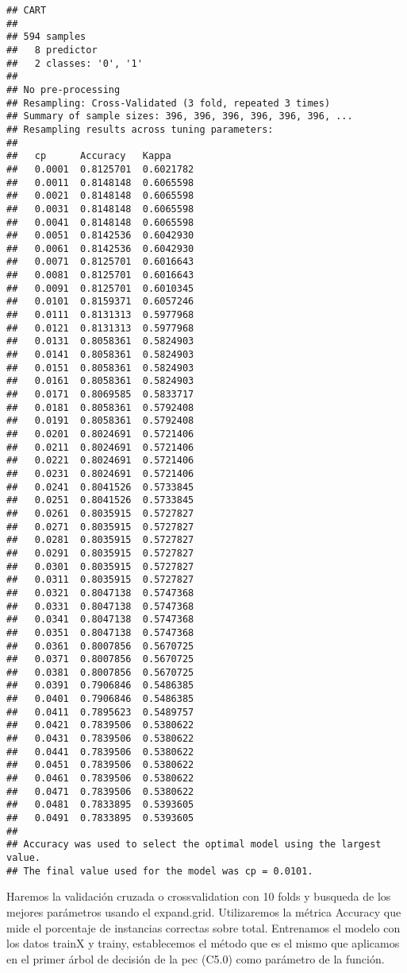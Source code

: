 \documentclass[
]{article}
\begin{document}
\begin{verbatim}
## CART 
## 
## 594 samples
##   8 predictor
##   2 classes: '0', '1' 
## 
## No pre-processing
## Resampling: Cross-Validated (3 fold, repeated 3 times) 
## Summary of sample sizes: 396, 396, 396, 396, 396, 396, ... 
## Resampling results across tuning parameters:
## 
##   cp      Accuracy   Kappa    
##   0.0001  0.8125701  0.6021782
##   0.0011  0.8148148  0.6065598
##   0.0021  0.8148148  0.6065598
##   0.0031  0.8148148  0.6065598
##   0.0041  0.8148148  0.6065598
##   0.0051  0.8142536  0.6042930
##   0.0061  0.8142536  0.6042930
##   0.0071  0.8125701  0.6016643
##   0.0081  0.8125701  0.6016643
##   0.0091  0.8125701  0.6010345
##   0.0101  0.8159371  0.6057246
##   0.0111  0.8131313  0.5977968
##   0.0121  0.8131313  0.5977968
##   0.0131  0.8058361  0.5824903
##   0.0141  0.8058361  0.5824903
##   0.0151  0.8058361  0.5824903
##   0.0161  0.8058361  0.5824903
##   0.0171  0.8069585  0.5833717
##   0.0181  0.8058361  0.5792408
##   0.0191  0.8058361  0.5792408
##   0.0201  0.8024691  0.5721406
##   0.0211  0.8024691  0.5721406
##   0.0221  0.8024691  0.5721406
##   0.0231  0.8024691  0.5721406
##   0.0241  0.8041526  0.5733845
##   0.0251  0.8041526  0.5733845
##   0.0261  0.8035915  0.5727827
##   0.0271  0.8035915  0.5727827
##   0.0281  0.8035915  0.5727827
##   0.0291  0.8035915  0.5727827
##   0.0301  0.8035915  0.5727827
##   0.0311  0.8035915  0.5727827
##   0.0321  0.8047138  0.5747368
##   0.0331  0.8047138  0.5747368
##   0.0341  0.8047138  0.5747368
##   0.0351  0.8047138  0.5747368
##   0.0361  0.8007856  0.5670725
##   0.0371  0.8007856  0.5670725
##   0.0381  0.8007856  0.5670725
##   0.0391  0.7906846  0.5486385
##   0.0401  0.7906846  0.5486385
##   0.0411  0.7895623  0.5489757
##   0.0421  0.7839506  0.5380622
##   0.0431  0.7839506  0.5380622
##   0.0441  0.7839506  0.5380622
##   0.0451  0.7839506  0.5380622
##   0.0461  0.7839506  0.5380622
##   0.0471  0.7839506  0.5380622
##   0.0481  0.7833895  0.5393605
##   0.0491  0.7833895  0.5393605
## 
## Accuracy was used to select the optimal model using the largest value.
## The final value used for the model was cp = 0.0101.
\end{verbatim}

Haremos la validación cruzada o crossvalidation con 10 folds y busqueda
de los mejores parámetros usando el expand.grid. Utilizaremos la métrica
Accuracy que mide el porcentaje de instancias correctas sobre total.
Entrenamos el modelo con los datos trainX y trainy, establecemos el
método que es el mismo que aplicamos en el primer árbol de decisión de
la pec (C5.0) como parámetro de la función.
\end{document}
